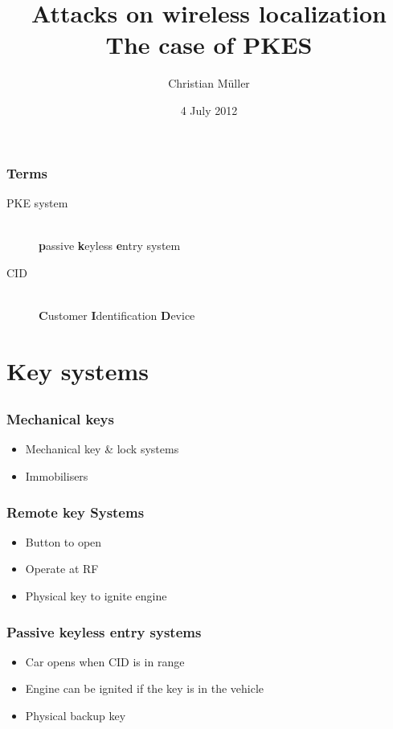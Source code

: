 \documentclass[12pt]{beamer}
\title{Attacks on wireless localization\\ The case of PKES}
\author{Christian Müller}
\date{4 July 2012}
\begin{document}
	\begin{frame}
		\titlepage
	\end{frame}

	\begin{frame}
		\tableofcontents
	\end{frame}

	\begin{frame}
		\frametitle{Terms}
			\begin{description}
				\item[PKE system]\hfill \\
						\textbf{p}assive \textbf{k}eyless \textbf{e}ntry system
				\item[CID] \hfill \\
					\textbf{C}ustomer \textbf{I}dentification \textbf{D}evice
			\end{description}
	\end{frame}
	
\section{Key systems}
\subsection*{}
	\begin{frame}
		\frametitle{Mechanical keys}
		\begin{itemize}
			\item Mechanical key \& lock systems
			\item Immobilisers
		\end{itemize}
	\end{frame}
	
	\begin{frame}
		\frametitle{Remote key Systems}
		\begin{itemize}
			\item Button to open
			\item Operate at RF 	%
			\item Physical key to ignite engine
		\end{itemize}
	\end{frame}

	\begin{frame}
		\frametitle{Passive keyless entry systems}
		\begin{itemize}
			\item Car opens when CID is in range
			\item Engine can be ignited if the key is in the vehicle
			\item Physical backup key
		\end{itemize}
	\end{frame}
\end{document}

